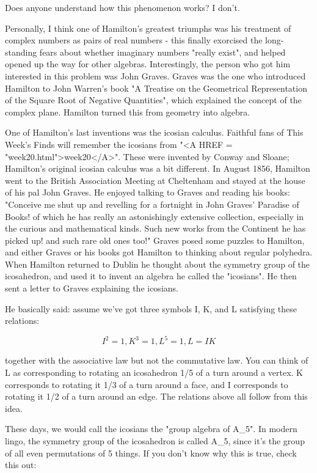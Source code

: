 Does anyone understand how this phenomenon works?  I don't.

Personally, I think one of Hamilton's greatest triumphs was his
treatment of complex numbers as pairs of real numbers - this finally
exorcised the long-standing fears about whether imaginary numbers 
"really exist", and helped opened up the way for other algebras.
Interestingly, the person who got him interested in this problem was
John Graves.  Graves was the one who introduced Hamilton to John
Warren's book "A Treatise on the Geometrical Representation of the
Square Root of Negative Quantities", which explained the concept of
the complex plane.  Hamilton turned this from geometry into algebra.

One of Hamilton's last inventions was the icosian calculus.  Faithful
fans of This Week's Finds will remember the icosians from "<A HREF
= "week20.html">week20</A>".  These were invented by Conway and
Sloane; Hamilton's original icosian calculus was a bit different.  In
August 1856, Hamilton went to the British Association Meeting at
Cheltenham and stayed at the house of his pal John Graves.  He enjoyed
talking to Graves and reading his books: "Conceive me shut up and
revelling for a fortnight in John Graves' Paradise of Books! of which he
has really an astonishingly extensive collection, especially in the
curious and mathematical kinds.  Such new works from the Continent he
has picked up! and such rare old ones too!" Graves posed some
puzzles to Hamilton, and either Graves or his books got Hamilton to
thinking about regular polyhedra.  When Hamilton returned to Dublin he
thought about the symmetry group of the icosahedron, and used it to
invent an algebra he called the "icosians".  He then sent a
letter to Graves explaining the icosians.

He basically said: assume we've got three symbols I, K, and L 
satisfying these relations:


$$

        I^{2} = 1,   K^{3} = 1,   L^{5} = 1,   L = IK 
$$
    
together with the associative law but not the commutative law.  
You can think of L as corresponding to rotating an icosahedron
1/5 of a turn around a vertex.  K corresponds to rotating it
1/3 of a turn around a face, and I corresponds to rotating it
1/2 of a turn around an edge.  The relations above all follow
from this idea.   

These days, we would call the icosians the "group algebra of 
A_{5}".
In modern lingo, the symmetry group of the icosahedron is called
A_{5}, since it's the group of all even permutations of 5 things.  
If you don't know why this is true, check this out:

